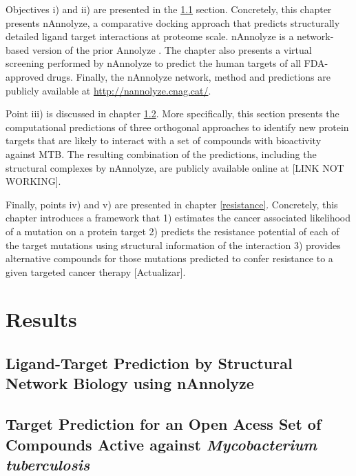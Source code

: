 \documentclass[12pt, b5paper,twoside]{tesi_upf}
\begin{document}
\par Objectives i) and ii) are presented in the \ref{nannolyze} section. Concretely, this chapter presents nAnnolyze, a comparative docking approach that predicts structurally detailed ligand target interactions at proteome scale. nAnnolyze is a network-based version of the prior Annolyze \cite{Marti-Renom2007}. The chapter also presents a virtual screening performed by nAnnolyze to predict the human targets of all FDA-approved drugs. Finally, the nAnnolyze network, method and predictions are publicly available at  \url{http://nannolyze.cnag.cat/}.

\par Point iii) is discussed in chapter \ref{mtb_results}. More specifically, this section presents the computational predictions    of three orthogonal approaches to identify new protein targets that are likely to interact with a set of compounds with bioactivity against MTB. The resulting combination of the predictions, including the structural complexes by nAnnolyze, are publicly available online at [LINK NOT WORKING].      

\par Finally, points iv) and v) are presented in chapter \ref{resistance}. Concretely, this chapter introduces a framework that 1) estimates the cancer associated likelihood of a mutation on a protein target 2) predicts the resistance potential of each of the target mutations using structural information of the interaction 3) provides alternative compounds for those mutations predicted to confer resistance to a given targeted cancer therapy [Actualizar].




\section{Results}

\subsection{Ligand-Target Prediction by Structural Network Biology using nAnnolyze}\label{nannolyze}

\par 

\subsection{Target Prediction for an Open Acess Set of Compounds Active against \textit{Mycobacterium tuberculosis}}\label{mtb_results}
\end{document}

